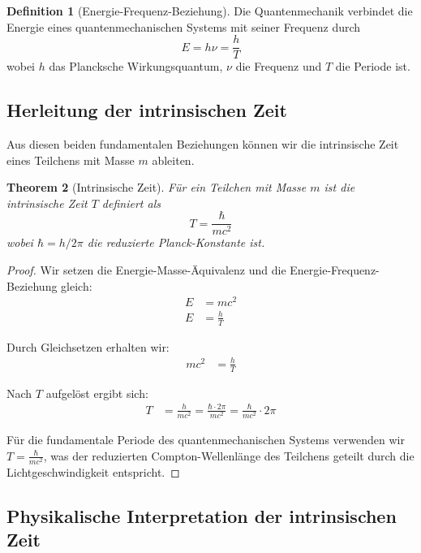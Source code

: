\documentclass{article}
\newtheorem{theorem}{Theorem}[section]
\theoremstyle{definition}
\newtheorem{definition}[theorem]{Definition}
\theoremstyle{remark}
\begin{document}
		\begin{definition}[Energie-Frequenz-Beziehung]
			Die Quantenmechanik verbindet die Energie eines quantenmechanischen Systems mit seiner Frequenz durch
			\begin{equation}
				E = h\nu = \frac{h}{T}
			\end{equation}
			wobei $h$ das Plancksche Wirkungsquantum, $\nu$ die Frequenz und $T$ die Periode ist.
		\end{definition}
		
		\subsection{Herleitung der intrinsischen Zeit}
		
		Aus diesen beiden fundamentalen Beziehungen können wir die intrinsische Zeit eines Teilchens mit Masse $m$ ableiten.
		
		\begin{theorem}[Intrinsische Zeit]
			Für ein Teilchen mit Masse $m$ ist die intrinsische Zeit $T$ definiert als
			\begin{equation}
				T = \frac{\hbar}{mc^2}
			\end{equation}
			wobei $\hbar = h/2\pi$ die reduzierte Planck-Konstante ist.
		\end{theorem}
		
		\begin{proof}
			Wir setzen die Energie-Masse-Äquivalenz und die Energie-Frequenz-Beziehung gleich:
			\begin{align}
				E &= mc^2 \\
				E &= \frac{h}{T}
			\end{align}
			
			Durch Gleichsetzen erhalten wir:
			\begin{align}
				mc^2 &= \frac{h}{T} 
			\end{align}
			
			Nach $T$ aufgelöst ergibt sich:
			\begin{align}
				T &= \frac{h}{mc^2} = \frac{\hbar \cdot 2\pi}{mc^2} = \frac{\hbar}{mc^2} \cdot 2\pi
			\end{align}
			
			Für die fundamentale Periode des quantenmechanischen Systems verwenden wir $T = \frac{\hbar}{mc^2}$, was der reduzierten Compton-Wellenlänge des Teilchens geteilt durch die Lichtgeschwindigkeit entspricht.
		\end{proof}
		
		\subsection{Physikalische Interpretation der intrinsischen Zeit}
		
\end{document}

